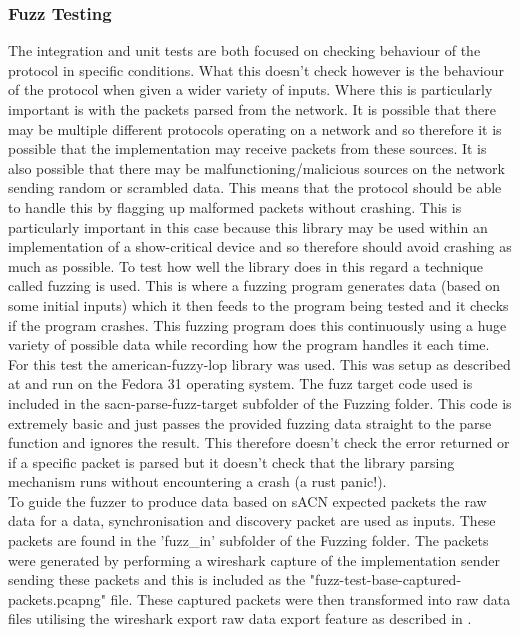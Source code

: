 \documentclass[11pt,a4paper]{report}
\begin{document}
\subsubsection{Fuzz Testing}
The integration and unit tests are both focused on checking behaviour of the protocol in specific conditions. What this doesn't check however is the behaviour of the protocol when given a wider variety of inputs. Where this is particularly important is with the packets parsed from the network. It is possible that there may be multiple different protocols operating on a network and so therefore it is possible that the implementation may receive packets from these sources. It is also possible that there may be malfunctioning/malicious sources on the network sending random or scrambled data. This means that the protocol should be able to handle this by flagging up malformed packets without crashing. This is particularly important in this case because this library may be used within an implementation of a show-critical device and so therefore should avoid crashing as much as possible. To test how well the library does in this regard a technique called fuzzing is used. This is where a fuzzing program generates data (based on some initial inputs) which it then feeds to the program being tested and it checks if the program crashes. This fuzzing program does this continuously using a huge variety of possible data while recording how the program handles it each time.\\

For this test the american-fuzzy-lop library \cite{RUST_AFL_FUZZ} was used. This was setup as described at \cite{RUST_AFL_FUZZ_DOC} and run on the Fedora 31 operating system. The fuzz target code used is included in the sacn-parse-fuzz-target subfolder of the Fuzzing folder. This code is extremely basic and just passes the provided fuzzing data straight to the parse function and ignores the result. This therefore doesn't check the error returned or if a specific packet is parsed but it doesn't check that the library parsing mechanism runs without encountering a crash (a rust panic!).\\

To guide the fuzzer to produce data based on sACN expected packets the raw data for a data, synchronisation and discovery packet are used as inputs. These packets are found in the 'fuzz\_in' subfolder of the Fuzzing folder. The packets were generated by performing a wireshark capture of the implementation sender sending these packets and this is included as the "fuzz-test-base-captured-packets.pcapng" file. These captured packets were then transformed into raw data files utilising the wireshark export raw data export feature as described in \cite{WIRESHARK_EXPORT_RAW}.\\
\end{document}
